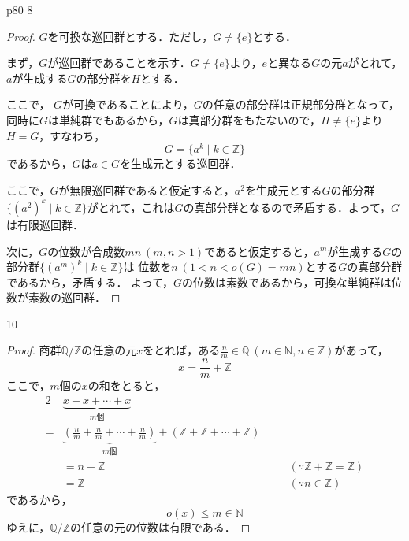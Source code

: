 \documentclass[dvipdfmx,uplatex,11pt]{jsarticle}
\theoremstyle{mytheorem}
\begin{document}
        \newpage
        p80 8
        \begin{leftbar}
            \begin{proof}
                $G$を可換な巡回群とする．ただし，$G \ne \{e\}$とする．

                まず，$G$が巡回群であることを示す．$G \ne \{e\}$より，$e$と異なる$G$の元$a$がとれて，$a$が生成する$G$の部分群を$H$とする．

                ここで， $G$が可換であることにより，$G$の任意の部分群は正規部分群となって，同時に$G$は単純群でもあるから，$G$は真部分群をもたないので，$H \ne \{e\}$より$H =G$，すなわち，
                \[
                    G = \{a^k \mid k \in \mathbb{Z}\}
                \]
                であるから，$G$は$a \in G$を生成元とする巡回群．

                ここで，$G$が無限巡回群であると仮定すると，$a^2$を生成元とする$G$の部分群$\{ (a^2)^k \mid k \in \mathbb{Z}\}$がとれて，これは$G$の真部分群となるので矛盾する．よって，$G$は有限巡回群．

                次に，$G$の位数が合成数$mn ~(m,n>1)$であると仮定すると，$a^m$が生成する$G$の部分群$\{ (a^m)^k \mid k \in \mathbb{Z}\}$は
                位数を$n~(1 <n <o(G)=mn)$とする$G$の真部分群であるから，矛盾する．
                よって，$G$の位数は素数であるから，可換な単純群は位数が素数の巡回群．
            \end{proof}
        \end{leftbar}
        10 
        \begin{leftbar}
            \begin{proof}
                商群$\mathbb{Q}/\mathbb{Z}$の任意の元$x$をとれば，ある$\frac{n}{m} \in \mathbb{Q}~(m \in \mathbb{N},n \in \mathbb{Z})$があって，
                \[
                    x= \frac{n}{m} + \mathbb{Z}
                \]
                ここで，$m$個の$x$の和をとると，
                \begin{alignat*}{2}
                    &\underbrace{x+x+\cdots+x}_{\text{$m$個}} & &\\
                    =& \underbrace{\left (\frac{n}{m}+\frac{n}{m}+\cdots+\frac{n}{m} \right)}_{\text{$m$個}} 
                    +(\mathbb{Z}+\mathbb{Z}+\cdots+\mathbb{Z}) & & \\
                    & = n + \mathbb{Z} & \quad &(\because \mathbb{Z}+\mathbb{Z}=\mathbb{Z}) \\
                    & = \mathbb{Z} & \quad & (\because n \in \mathbb{Z})
                \end{alignat*}
                であるから，
                \[
                o(x) \le m \in \mathbb{N}
                \]
                ゆえに，$\mathbb{Q}/\mathbb{Z}$の任意の元の位数は有限である．
            \end{proof}
        \end{leftbar}
\end{document}
